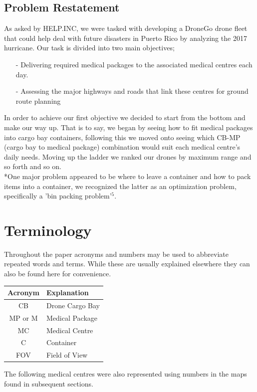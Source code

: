 \documentclass[a4paper,12pt]{article}
\begin{document}
\subsection{Problem Restatement}
As asked by HELP.INC, we were tasked with developing a DroneGo drone fleet that could help deal with future disasters in
Puerto Rico by analyzing the 2017 hurricane. Our task is divided into two main objectives;
\begin{itemize}
\item[-]Delivering required medical packages to the associated medical centres each day.
\item[-]Assessing the major highways and roads that link these centres for ground route planning
\end{itemize}
In order to achieve our first objective we decided to start from the bottom and make our way up. That is to say, we began by seeing how to fit medical packages into cargo bay containers, following this
we moved onto seeing which CB-MP (cargo bay to medical package) combination would suit each medical centre's daily needs. Moving up the ladder we ranked our drones by maximum range and so forth and so on.
\\*One major problem appeared to be where to leave a container and how to pack items into a container, we recognized the latter as an optimization problem, specifically a 'bin packing problem'$^5$.

\section{Terminology}
Throughout the paper acronyms and numbers may be used to abbreviate repeated words and terms. While these are usually explained elsewhere they can also be found here for convenience.

\begin{center}
\begin{tabular}{ |c|l| }
\hline
 \bf{Acronym} & \bf{Explanation}  \\\hline
 CB & Drone Cargo Bay \\
 MP or M & Medical Package \\
 MC & Medical Centre\\
 C & Container \\
 FOV & Field of View \\
 \hline
\end{tabular}
\end{center}
The following medical centres were also represented using numbers in the maps found in subsequent sections.
\end{document}
